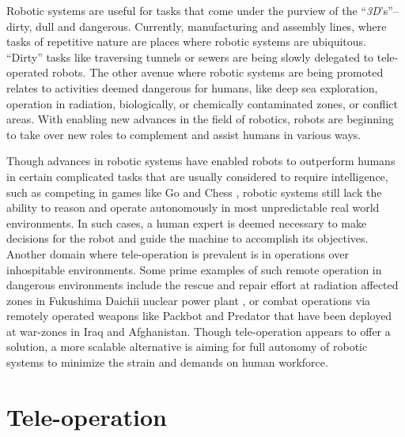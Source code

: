 \documentclass {udthesis}
\begin{document}
Robotic systems are useful for tasks that come under the purview of the ``\emph{3D}'s''--dirty, dull and dangerous. 
Currently, manufacturing and assembly lines, where tasks of repetitive nature are places where robotic systems are ubiquitous. ``Dirty'' tasks like traversing tunnels or sewers are being slowly delegated to tele-operated robots. 
The other avenue where robotic systems are being promoted relates to activities deemed dangerous for humans, like deep sea exploration, operation in radiation, biologically, or chemically contaminated zones, or conflict areas. With enabling new advances in the field of robotics, robots are beginning to take over new roles to complement and assist humans in various ways.

Though advances in robotic systems have enabled robots to outperform humans in certain complicated tasks that are usually considered to require intelligence, such as competing in games like Go \cite{deepmind} and Chess \cite{deepblue}, 
robotic systems still lack the ability to reason and operate
autonomously in most unpredictable real world environments. 
In such cases, a human expert is deemed necessary to make decisions for the robot and guide the machine
to accomplish its objectives. Another domain where tele-operation is prevalent is in operations over inhospitable environments. Some prime examples of such remote operation in
dangerous environments include the rescue and repair effort at radiation affected zones in Fukushima Daichii nuclear power plant \cite{fukushima}, or combat operations via remotely operated weapons like Packbot \cite{packbot} and Predator \cite{predator} that have been deployed
at war-zones in Iraq and Afghanistan. Though tele-operation appears to offer a solution, a more scalable alternative
is aiming for full autonomy of robotic systems to minimize the strain and demands on human workforce.

\section{Tele-operation}
\end{document}
